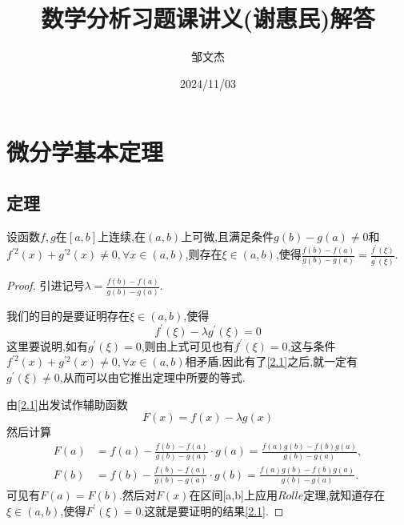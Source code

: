 \documentclass[lang=cn,newtx,10pt,scheme=chinese]{../Template/elegantbook}
\title{数学分析习题课讲义(谢惠民)解答}
\author{邹文杰}
\date{2024/11/03}
\begin{document}
\maketitle
\frontmatter

\tableofcontents

\mainmatter%



\chapter{微分学基本定理}

\section{定理}

\begin{theorem}\label{the:2.1}
设函数$f,g$在$[a,b]$上连续,在$(a,b)$上可微,且满足条件$g(b)-g(a)\neq0$和$f^{\prime2}(x)+g^{\prime2}(x)\neq0,\forall x\in(a,b)$,则存在$\xi\in(a,b)$,使得$\frac{f(b)-f(a)}{g(b)-g(a)}=\frac{f^{\prime}(\xi)}{g^{\prime}(\xi)}$.
\end{theorem}
\begin{proof}
    引进记号$\lambda=\frac{f(b)-f(a)}{g(b)-g(a)}$.
    
    我们的目的是要证明存在$\xi\in(a,b)$,使得
    \begin{equation}\label{2.1}
        f^{\prime}(\xi)-\lambda g^{\prime}(\xi)=0
    \end{equation}
这里要说明,如有$g^{\prime}(\xi)=0$,则由上式可见也有$f^{\prime}(\xi)=0$,这与条件$f^{\prime2}(x)+g^{\prime2}(x)\neq0,\forall x\in(a,b)$相矛盾.因此有了\eqref{2.1}之后,就一定有$g^{\prime}(\xi)\neq0$,从而可以由它推出定理中所要的等式.

由\eqref{2.1}出发试作辅助函数
\begin{equation}
    F(x)=f(x)-\lambda g(x)
    \nonumber
\end{equation}
然后计算
\begin{align*}
F(a)&=f(a)-\frac{f(b)-f(a)}{g(b)-g(a)}\cdot g(a)=\frac{f(a)g(b)-f(b)g(a)}{g(b)-g(a)},\\
F(b)&=f(b)-\frac{f(b)-f(a)}{g(b)-g(a)}\cdot g(b)=\frac{f(a)g(b)-f(b)g(a)}{g(b)-g(a)}.
\end{align*}
可见有$F(a)=F(b)$.然后对$F(x)$在区间[a,b]上应用$Rolle$定理,就知道存在$\xi\in(a,b)$,使得$F^{\prime}(\xi)=0$.这就是要证明的结果\eqref{2.1}.
\end{proof}
\end{document}
